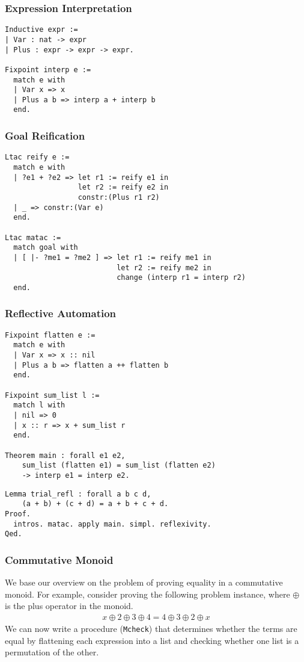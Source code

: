 \documentclass{beamer}
\begin{document}
\begin{frame}[fragile]
  \frametitle{Expression Interpretation}
\begin{verbatim}
Inductive expr :=
| Var : nat -> expr
| Plus : expr -> expr -> expr.

Fixpoint interp e :=
  match e with
  | Var x => x
  | Plus a b => interp a + interp b
  end.
\end{verbatim}
\end{frame}

\begin{frame}[fragile]
  \frametitle{Goal Reification}
\begin{verbatim}
Ltac reify e :=
  match e with
  | ?e1 + ?e2 => let r1 := reify e1 in
                 let r2 := reify e2 in
                 constr:(Plus r1 r2)
  | _ => constr:(Var e)
  end.

Ltac matac :=
  match goal with
  | [ |- ?me1 = ?me2 ] => let r1 := reify me1 in
                          let r2 := reify me2 in
                          change (interp r1 = interp r2)
  end.
\end{verbatim}
\end{frame}

\begin{frame}[fragile]
  \frametitle{Reflective Automation}
  \vspace{-.5em}
\begin{verbatim}
Fixpoint flatten e :=
  match e with
  | Var x => x :: nil
  | Plus a b => flatten a ++ flatten b
  end.

Fixpoint sum_list l :=
  match l with
  | nil => 0
  | x :: r => x + sum_list r
  end.

Theorem main : forall e1 e2,
    sum_list (flatten e1) = sum_list (flatten e2)
    -> interp e1 = interp e2.
\end{verbatim}
\end{frame}

\begin{frame}[fragile]
\begin{verbatim}
Lemma trial_refl : forall a b c d,
    (a + b) + (c + d) = a + b + c + d.
Proof.
  intros. matac. apply main. simpl. reflexivity.
Qed.
\end{verbatim}
\end{frame}

\begin{frame}\justifying
  \frametitle{Commutative Monoid}
  We base our overview on the problem of proving equality in a commutative monoid. For example, consider proving the following problem instance, where $\oplus$ is the plus operator in the monoid.
  \begin{align*}
    x \oplus 2 \oplus 3 \oplus 4 = 4 \oplus 3 \oplus 2 \oplus x
  \end{align*}
  We can now write a procedure (\texttt{Mcheck}) that determines whether the terms are equal by flattening each expression into a list and checking whether one list is a permutation of the other.
\end{frame}
\end{document}
